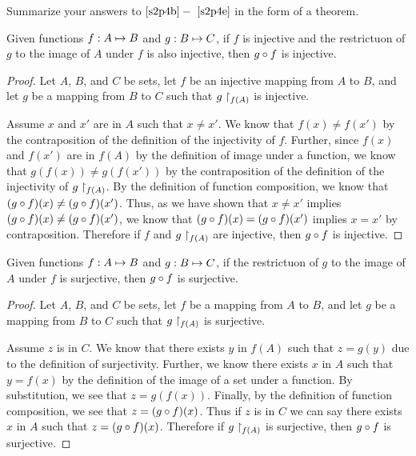 \documentclass[main.tex]{subfiles}
\begin{document}
\subproblem{}\label{s2p4f}

Summarize your answers to \(\ref{s2p4b} -~\ref{s2p4e}\) in the form of a
theorem.

\begin{thm}
	Given functions \({f}: {A} \mapsto{} {B}\) and \({g}: {B} \mapsto{} {C}\), if
	\(f\) is injective and the restrictuon of \(g\) to the image of \(A\)
	under \(f\) is also injective, then \({g} \circ{} {f}\) is injective.
\end{thm}
\begin{proof}
	Let \(A\), \(B\), and \(C\) be sets, let \(f\) be an injective mapping
	from \(A\) to \(B\), and let \(g\) be a mapping from \(B\) to \(C\) such
	that \({g}\restriction_{f(A)}\) is injective.

	Assume \(x\) and \(x'\) are in \(A\) such that \(x \neq x'\). We know
	that \(f(x) \neq f(x')\) by the contraposition of the definition of
	the injectivity of \(f\). Further, since \(f(x)\) and \(f(x')\) are in
	\(f(A)\) by the definition of image under a function, we know that
	\(g(f(x)) \neq g(f(x'))\) by the contraposition of the definition of
	the injectivity of \({g}\restriction_{f(A)}\). By the definition of function
	composition, we know that
	\(({g} \circ{} {f})({x}) \neq ({g} \circ{} {f})({x'})\). Thus, as we
	have shown that \(x \neq x'\) implies
	\(({g} \circ{} {f})({x}) \neq ({g} \circ{} {f})({x'})\), we know that
	\(({g} \circ{} {f})({x}) = ({g} \circ{} {f})({x'})\) implies \(x = x'\)
	by contraposition. Therefore if \(f\) and \({g}\restriction_{f(A)}\) are
	injective, then \({g} \circ{} {f}\) is injective.
\end{proof}

\begin{thm}
	Given functions \({f}: {A} \mapsto{} {B}\) and \({g}: {B} \mapsto{} {C}\), if the
	restrictuon of \(g\) to the image of \(A\) under \(f\) is surjective,
	then \({g} \circ{} {f}\) is surjective.
\end{thm}
\begin{proof}
	Let \(A\), \(B\), and \(C\) be sets, let \(f\) be a mapping from \(A\)
	to \(B\), and let \(g\) be a mapping from \(B\) to \(C\) such that
	\({g}\restriction_{f(A)}\) is surjective.

	Assume \(z\) is in \(C\). We know that there exists \(y\) in \(f(A)\)
	such that \(z = g(y)\) due to the definition of surjectivity. Further,
	we know there exists \(x\) in \(A\) such that \(y = f(x)\) by the
	definition of the image of a set under a function. By substitution, we
	see that \(z = g(f(x))\). Finally, by the definition of function
	composition, we see that \(z = ({g} \circ{} {f})({x})\). Thus if \(z\)
	is in \(C\) we can say there exists \(x\) in \(A\) such that
	\(z = ({g} \circ{} {f})({x})\). Therefore if \({g}\restriction_{f(A)}\) is
	surjective, then \({g} \circ{} {f}\) is surjective.
\end{proof}
\end{document}
